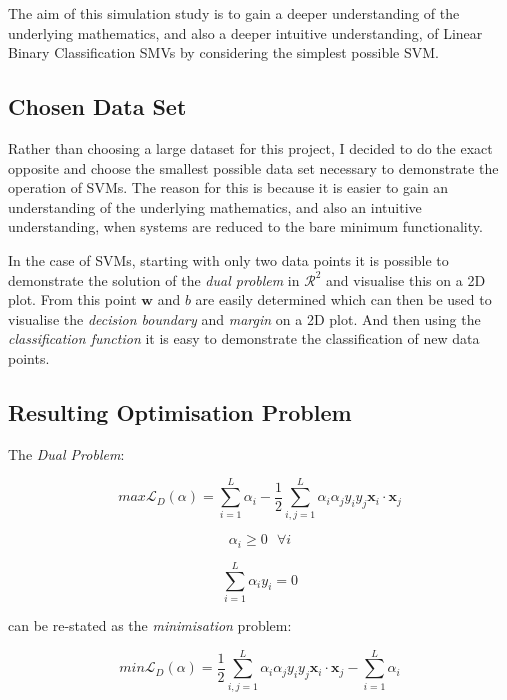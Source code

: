 \documentclass[10pt, a4paper,reqno]{amsart}
\begin{document}
The aim of this simulation study is to gain a deeper understanding of the underlying mathematics, and also a deeper intuitive understanding, of Linear Binary Classification SMVs by considering the simplest possible SVM.

\subsection{Chosen Data Set}

Rather than choosing a large dataset for this project, I decided to do the exact opposite and choose the smallest possible data set necessary to demonstrate the operation of SVMs. The reason for this is because it is easier to gain an understanding of the underlying mathematics, and also an intuitive understanding, when systems are reduced to the bare minimum functionality.

In the case of SVMs, starting with only two data points it is possible to demonstrate the solution of the \emph{dual problem} in $\mathcal{R}^2$ and visualise this on a 2D plot. From this point $\mathbf{w}$ and $b$ are easily determined which can then be used to visualise the \emph{decision boundary} and \emph{margin} on a 2D plot. And then using the \emph{classification function} it is easy to demonstrate the classification of new data points.


\subsection{Resulting Optimisation Problem}

The \emph{Dual Problem}:

\begin{equation}
max\mathcal{L}_D(\alpha) = \sum_{i=1}^{L}\alpha_i - \frac{1}{2}\sum_{i,j=1}^{L}\alpha_i \alpha_j y_i y_j\mathbf{x}_i\cdot\mathbf{x}_j
\end{equation}

\begin{equation}
\alpha_i\geq0\text{ }\forall{i}
\end{equation}

\begin{equation}
\sum_{i=1}^{L}\alpha_i y_i = 0
\end{equation}

can be re-stated as the \emph{minimisation} problem:

\begin{equation}
min\mathcal{L}_D(\alpha) = \frac{1}{2}\sum_{i,j=1}^{L}\alpha_i \alpha_j y_i y_j\mathbf{x}_i\cdot\mathbf{x}_j - \sum_{i=1}^{L}\alpha_i
\end{equation}
\end{document}
